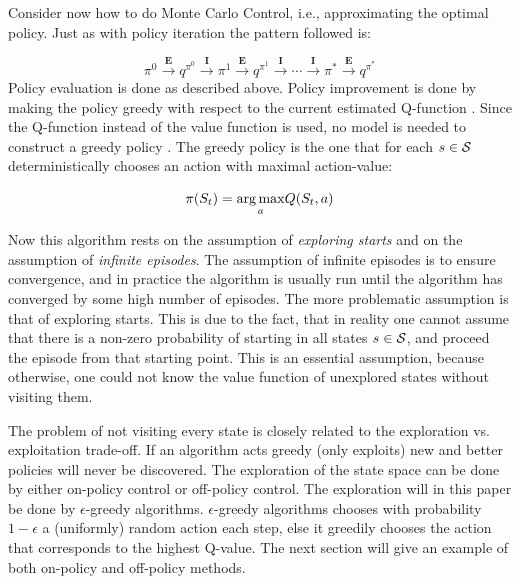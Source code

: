 Consider now how to do Monte Carlo Control, i.e., approximating the optimal policy. Just as with policy iteration the pattern followed is:

\begin{equation}
    \label{eq:montecarlocontrol}
    \pi^0 \overset{\textbf{E}}{\longrightarrow}
    q^{\pi^0} \overset{\textbf{I}}{\longrightarrow} \pi^1 \overset{\textbf{E}}{\longrightarrow} q^{\pi^1} \overset{\textbf{I}}{\longrightarrow} \cdots \overset{\textbf{I}}{\longrightarrow} \pi^* \overset{\textbf{E}}{\longrightarrow} q^{\pi^*}
\end{equation}
Policy evaluation is done as described above. Policy improvement is done by making the policy greedy with respect to the current estimated Q-function \parencite{sutton_reinforcement_2018}. Since the Q-function instead of the value function is used, no model is needed to construct a greedy policy \parencite{sutton_reinforcement_2018}. The greedy policy is the one that for each $s \in \mathcal{S}$ deterministically chooses an action with maximal action-value:

\begin{equation}
    \pi(S_t) = \underset{a}{\operatorname*{arg\,max}}  Q( S_t, a )
\end{equation}

Now this algorithm rests on the assumption of \textit{exploring starts} and on the assumption of \textit{infinite episodes}. The assumption of infinite episodes is to ensure convergence, and in practice the algorithm is usually run until the algorithm has converged by some high number of episodes. The more problematic assumption is that of exploring starts. This is due to the fact, that in reality one cannot assume that there is a non-zero probability of starting in all states $s \in \mathcal{S}$, and proceed the episode from that starting point. This is an essential assumption, because otherwise, one could not know the value function of unexplored states without visiting them. 

The problem of not visiting every state is closely related to the exploration vs. exploitation trade-off. If an algorithm acts greedy (only exploits) new and better policies will never be discovered. The exploration of the state space can be done by either on-policy control or off-policy control. The exploration will in this paper be done by $\epsilon$-greedy algorithms. $\epsilon$-greedy algorithms chooses with probability $1 - \epsilon$ a (uniformly) random action each step, else it greedily chooses the action that corresponds to the highest Q-value. The next section will give an example of both on-policy and off-policy methods. 

